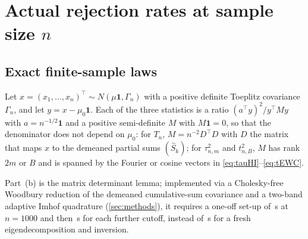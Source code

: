 \section{Actual rejection rates at sample size \texorpdfstring{$n$}{n}}\label{sec:finite}

\subsection{Exact finite-sample laws}
Let $x=(x_1,\dots,x_n)^\top\sim N(\mu\mathbf 1,\Gamma_n)$ with a positive definite Toeplitz covariance $\Gamma_n$, and
let $y=x-\mu_0\mathbf 1$. Each of the three statistics is a ratio $(a^\top y)^2/y^\top My$ with $a=n^{-1/2}\mathbf 1$ and a
positive semi-definite $M$ with $M\mathbf 1=0$, so that the denominator does not depend on $\mu_0$: for $T_n$,
$M=n^{-2}D^\top D$ with $D$ the matrix that maps $x$ to the demeaned partial sums $(\hat S_k)$; for $\tau_{n,m}^2$ and $t_{n,B}^2$, $M$ has rank $2m$
or $B$ and is spanned by the Fourier or cosine vectors in \eqref{eq:tauHI}--\eqref{eq:tEWC}.


Part~(b) is the matrix determinant lemma; implemented via a Cholesky-free Woodbury reduction of the demeaned
cumulative-sum covariance and a two-band adaptive Imhof quadrature (\cref{sec:methods}), it requires a one-off set-up of
\,s at $n=1000$ and then \,s for each further cutoff, instead of
\,s for a fresh eigendecomposition and inversion.

